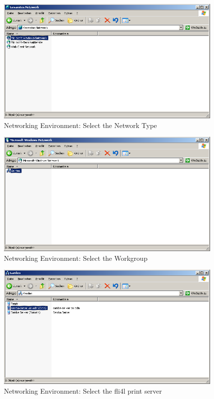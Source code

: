 \begin{figure}[hbt!]
\centering
\includegraphics[width=\columnwidth]{image003}
\caption{Networking Environment: Select the Network Type}
\label{fig:sambalpd:networking-environment:2}
\end{figure}

\begin{figure}[hbt!]
\centering
\includegraphics[width=\columnwidth]{image004}
\caption{Networking Environment: Select the Workgroup}
\label{fig:sambalpd:networking-environment:3}
\end{figure}

\begin{figure}[hbt!]
\centering
\includegraphics[width=\columnwidth]{image005}
\caption{Networking Environment: Select the fli4l print server}
\label{fig:sambalpd:networking-environment:4}
\end{figure}

